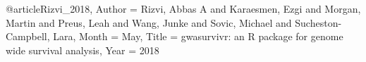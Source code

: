 

@article{Rizvi_2018,
 Author = {Rizvi, Abbas A and Karaesmen, Ezgi and Morgan, Martin and Preus, Leah and Wang, Junke and Sovic, Michael and Sucheston-Campbell, Lara},
 Month = {May},
 Title = {gwasurvivr: an R package for genome wide survival analysis},
 Year = {2018}}

